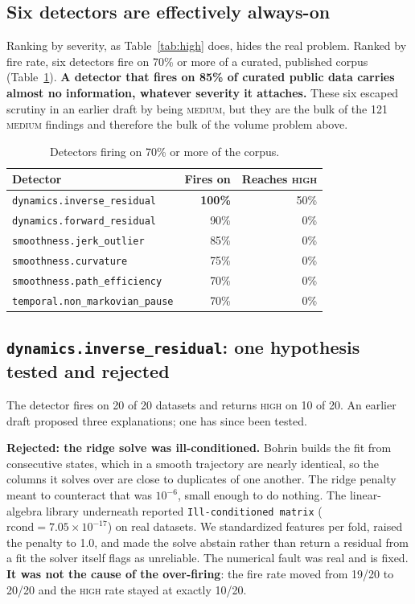 \documentclass[10pt,a4paper]{article}
\newcommand{\dtr}[1]{\texttt{\small #1}}
\newcommand{\warn}[1]{\textcolor{critical}{\textbf{#1}}}
\begin{document}
\subsection{Six detectors are effectively always-on}
\label{sec:alwayson}

Ranking by severity, as Table~\ref{tab:high} does, hides the real problem. Ranked by fire
rate, six detectors fire on 70\% or more of a curated, published corpus
(Table~\ref{tab:alwayson}). \textbf{A detector that fires on 85\% of curated public data
carries almost no information, whatever severity it attaches.} These six escaped scrutiny in
an earlier draft by being \textsc{medium}, but they are the bulk of the 121 \textsc{medium}
findings and therefore the bulk of the volume problem above.

\begin{table}[tb]
\centering
\caption{Detectors firing on 70\% or more of the corpus.}
\label{tab:alwayson}
\small
\begin{tabular}{lrr}
\toprule
Detector & Fires on & Reaches \textsc{high} \\
\midrule
\dtr{dynamics.inverse\_residual}   & \warn{100\%} & 50\% \\
\dtr{dynamics.forward\_residual}   & 90\% & 0\% \\
\dtr{smoothness.jerk\_outlier}     & 85\% & 0\% \\
\dtr{smoothness.curvature}         & 75\% & 0\% \\
\dtr{smoothness.path\_efficiency}  & 70\% & 0\% \\
\dtr{temporal.non\_markovian\_pause} & 70\% & 0\% \\
\bottomrule
\end{tabular}
\end{table}

\subsection{\dtr{dynamics.inverse\_residual}: one hypothesis tested and rejected}
\label{sec:suspect}

The detector fires on 20 of 20 datasets and returns \textsc{high} on 10 of 20. An earlier
draft proposed three explanations; one has since been tested.

\textbf{Rejected: the ridge solve was ill-conditioned.} Bohrin builds the fit from consecutive
states, which in a smooth trajectory are nearly identical, so the columns it solves over are
close to duplicates of one another. The ridge penalty meant to counteract that was
$10^{-6}$, small enough to do nothing. The linear-algebra library underneath reported
\dtr{Ill-conditioned matrix} ($\mathrm{rcond} = 7.05\times10^{-17}$) on real datasets. We
standardized features per fold, raised the penalty to 1.0, and made the solve abstain rather
than return a residual from a fit the solver itself flags as unreliable. The numerical fault
was real
and is fixed. \textbf{It was not the cause of the over-firing}: the fire rate moved from
19/20 to 20/20 and the \textsc{high} rate stayed at exactly 10/20.
\end{document}
